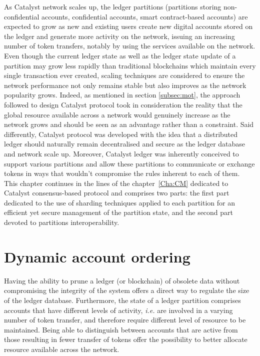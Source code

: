 As Catalyst network scales up, the ledger partitions (partitions storing non-confidential accounts, confidential accounts, smart contract-based accounts) are expected to grow as new and existing users create new digital accounts stored on the ledger and generate more activity on the network, issuing an increasing number of token transfers, notably by using the services available on the network. Even though the current ledger state as well as the ledger state update of a partition may grow less rapidly than traditional blockchains which maintain every single transaction ever created, scaling techniques are considered to ensure the network performance not only remains stable but also improves as the network popularity grows. Indeed, as mentioned in section \ref{subsec:mot}, the approach followed to design Catalyst protocol took in consideration the reality that the global resource available across a network would genuinely increase as the network grows and should be seen as an advantage rather than a constraint. Said differently, Catalyst protocol was developed with the idea that a distributed ledger should naturally remain decentralised and secure as the ledger database and network scale up. Moreover, Catalyst ledger was inherently conceived to support various partitions and allow these partitions to communicate or exchange tokens in ways that wouldn't compromise the rules inherent to each of them. \\

This chapter continues in the lines of the chapter~\ref{Cha:CM} dedicated to Catalyst consensus-based protocol and comprises two parts: the first part dedicated to the use of sharding techniques applied to each partition for an efficient yet secure management of the partition state, and the second part devoted to partitions interoperability. %

\section{Dynamic account ordering}
Having the ability to prune a ledger (or blockchain) of obsolete data without compromising the integrity of the system offers a direct way to regulate the size of the ledger database. Furthermore, the state of a ledger partition comprises accounts that have different levels of activity, \textit{i.e.} are involved in a varying number of token transfer, and therefore require different level of resource to be maintained. Being able to distinguish between accounts that are active from those resulting in fewer transfer of tokens offer the possibility to better allocate resource available across the network. \\

